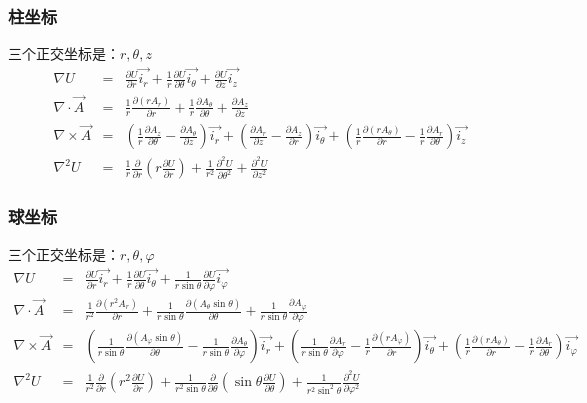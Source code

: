 \subsubsection{柱坐标}
三个正交坐标是：$r, \theta, z$
\begin{eqnarray}\label{eqn:field cyl}
\nabla U&=&\frac{\partial U}{\partial r}\vec{i_r} +\frac{1}{r}\frac{\partial U}{\partial \theta}\vec{i_{\theta}}+\frac{\partial U}{\partial z}\vec{i_z} \nonumber \\
\nabla\cdot \vec{A} &=& \frac{1}{r}\frac{\partial{(r A_r)}}{\partial r} +\frac{1}{r}\frac{\partial{A_\theta}}{\partial \theta}+\frac{\partial{A_z}}{\partial z}\nonumber \\
\nabla\times \vec{A}&=& (\frac{1}{r}\frac{\partial{A_z}}{\partial \theta} -\frac{\partial{A_\theta}}{\partial z})\vec{i_r} + (\frac{\partial{A_r}}{\partial z} -\frac{\partial{A_z}}{\partial r}) \vec{i_\theta}
+ (\frac{1}{r}\frac{\partial{(r A_\theta)}}{\partial r} -\frac{1}{r}\frac{\partial{A_r}}{\partial \theta})\vec{i_z}  \nonumber \\
\nabla^2 U&=&\frac{1}{r}\frac{\partial}{\partial r}(r\frac{\partial U}{\partial r})+\frac{1}{r^2}\frac{\partial^2 U}{\partial \theta^2}+\frac{\partial^2 U}{\partial z^2}
\end{eqnarray}

\subsubsection{球坐标}
三个正交坐标是：$r, \theta, \varphi$
\begin{eqnarray}\label{eqn:field sphl}
\nabla U&=&\frac{\partial U}{\partial r}\vec{i_r} +\frac{1}{r}\frac{\partial U}{\partial \theta}\vec{i_{\theta}}+\frac{1}{r\sin\theta}\frac{\partial U}{\partial \varphi}\vec{i_\varphi} \nonumber \\
\nabla\cdot \vec{A} &=& \frac{1}{r^2}\frac{\partial{(r^2 A_r)}}{\partial r} +\frac{1}{r\sin\theta}\frac{\partial{(A_\theta \sin\theta)}}{\partial\theta}+\frac{1}{r\sin\theta}\frac{\partial{A_\varphi}}{\partial \varphi}\nonumber \\
\nabla\times \vec{A}&=& (\frac{1}{r\sin\theta}\frac{\partial{(A_\varphi \sin\theta)}}{\partial \theta} -\frac{1}{r\sin\theta}\frac{\partial{A_\theta}}{\partial \varphi})\vec{i_r} + (\frac{1}{r\sin\theta}\frac{\partial{A_r}}{\partial \varphi} -\frac{1}{r}\frac{\partial{(r A_\varphi)}}{\partial r}) \vec{i_\theta}
+ (\frac{1}{r}\frac{\partial{(r A_\theta)}}{\partial r} -\frac{1}{r}\frac{\partial{A_r}}{\partial \theta})\vec{i_\varphi}  \nonumber \\
\nabla^2 U&=&\frac{1}{r^2}\frac{\partial}{\partial r}(r^2\frac{\partial U}{\partial r})+
\frac{1}{r^2\sin\theta}\frac{\partial}{\partial\theta}(\sin\theta\frac{\partial U}{\partial \theta})+\frac{1}{r^2\sin^2\theta}\frac{\partial^2 U}{\partial \varphi^2}
\end{eqnarray}


